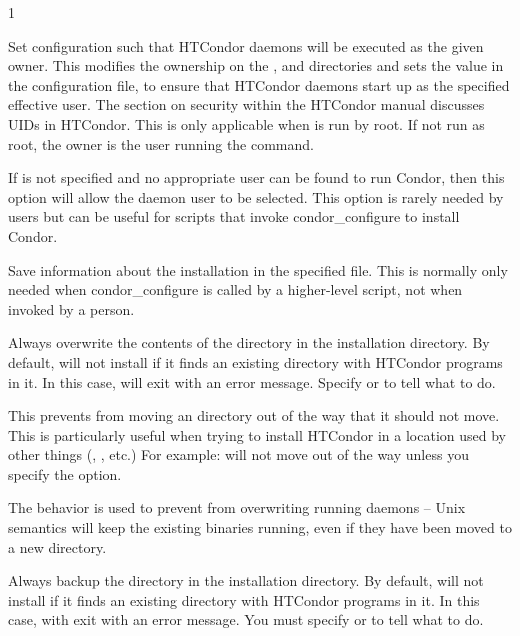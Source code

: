\begin{ManPage}{\label{man-condor-configure}}{1}
\begin{Options}
   {Set configuration
    such that HTCondor daemons will be executed as the given owner.
    This modifies the 
    ownership on the ,  and 
    directories and sets the  value
    in the configuration file,
    to ensure that HTCondor daemons start up as the specified effective user.
    The section on security within the HTCondor manual discusses
    UIDs in HTCondor.
    This is only applicable when  is run by root.
    If not run as root, the owner is the user running
    the  command.  }

   {If  is not specified and
    no appropriate user can be found to run Condor, then this option
    will allow the daemon user to be selected. This option is rarely
    needed by users but can be useful for scripts that invoke
    condor\_configure to install Condor.}

   {Save information about the
    installation in the specified file. This is normally only needed
    when condor\_configure is called by a higher-level script, not when
    invoked by a person.}

   {
    Always overwrite the contents of the  directory in
    the installation directory.  By default, 
    will not install if it finds an existing  directory
    with HTCondor programs in it.  In this case, 
    will exit with an error message.  Specify
     or  to tell 
    what to do.

    This prevents  from moving an 
    directory out of the way that it should not move.  This is
    particularly useful when trying to install HTCondor in a
    location used by other things (, , etc.)
    For example:  
         will not move
     out of the way unless you specify the
     option.

    The  behavior is used to
    prevent  from overwriting running daemons --
    Unix semantics will keep the existing binaries running, even
    if they have been moved to a new directory.}

   {
    Always backup the  directory in the installation
    directory.  By default,  will not install if
    it finds an existing  directory with HTCondor programs
    in it.  In this case,  with exit with an
    error message.  You must specify  or
     to tell  what to do.

}
\end{Options}
\end{ManPage}
